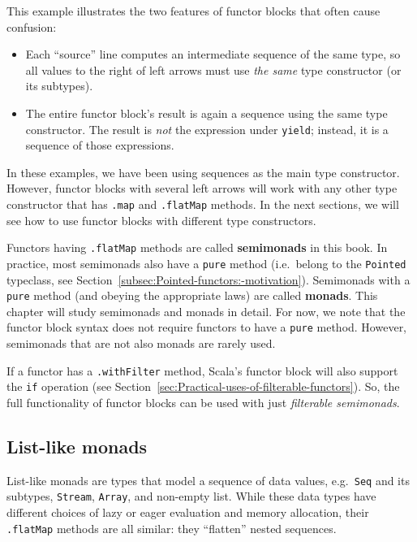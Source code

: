 \vspace{0.2\baselineskip}
This example illustrates the two features of functor blocks that often
cause confusion:
\begin{itemize}
\item Each ``source'' line computes an intermediate sequence of the same
type, so all values to the right of left arrows must use \emph{the
same} type constructor (or its subtypes).
\item The entire functor block's result is again a sequence using the same
type constructor. The result is \emph{not} the expression under \lstinline!yield!;
instead, it is a sequence of those expressions.
\end{itemize}
In these examples, we have been using sequences as the main type constructor.
However, functor blocks with several left arrows will work with any
other type constructor that has \lstinline!.map! and \lstinline!.flatMap!
methods. In the next sections, we will see how to use functor blocks
with different type constructors. 

Functors having \lstinline!.flatMap! methods are called \textbf{semimonads}
in this book. In practice, most semimonads also
have a \lstinline!pure! method (i.e.~belong to the \lstinline!Pointed!
typeclass, see Section~\ref{subsec:Pointed-functors:-motivation}).
Semimonads with a \lstinline!pure! method (and obeying the appropriate
laws) are called \textbf{monads}. This chapter will
study semimonads and monads in detail. For now, we note that the functor
block syntax does not require functors to have a \lstinline!pure!
method. However, semimonads that are not also monads are rarely used.

If a functor has a \lstinline!.withFilter! method, Scala's functor
block will also support the \lstinline!if! operation (see Section~\ref{sec:Practical-uses-of-filterable-functors}).
So, the full functionality of functor blocks can be used with just
\emph{filterable semimonads}.

\subsection{List-like monads}

List-like monads are types that model a sequence of data values, e.g.~\lstinline!Seq!
and its subtypes, \lstinline!Stream!, \lstinline!Array!, and non-empty
list. While these data types have different choices of lazy or eager
evaluation and memory allocation, their \lstinline!.flatMap! methods
are all similar: they ``flatten'' nested sequences.

